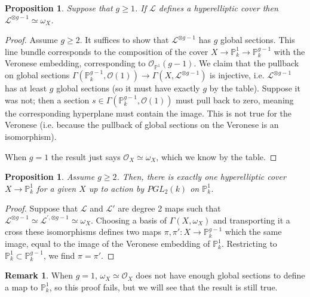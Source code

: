 \documentclass[10pt]{article}
\newtheorem{prop}[thm]{Proposition}
\theoremstyle{definition}
\newtheorem{rmk}[thm]{Remark}
\newcommand{\PP}{\mathbb{P}}
\newcommand{\OO}{\mathcal{O}}
\newcommand{\LL}{\mathcal{L}}
\begin{document}
\begin{prop}
Suppose that $g \geq 1$.  If $\LL$ defines a hyperelliptic cover then $\LL^{\otimes g - 1} \simeq \omega_X$.
\end{prop}
\begin{proof}
Assume $g \geq 2$.  It suffices to show that $\LL^{\otimes g-1}$ has $g$ global sections.  This line bundle corresponds to the composition of the cover $X \rightarrow \PP^1_k \rightarrow \PP^{g-1}_k$ with the Veronese embedding, corresponding to $\OO_{\PP^1}(g-1)$.   We claim that the pullback on global sections $\Gamma(\PP^{g-1}_k, \OO(1)) \rightarrow \Gamma(X, \LL^{\otimes g-1})$ is injective, i.e. $\LL^{\otimes g-1}$ has at least $g$ global sections (so it must have exactly $g$ by the table).  Suppose it was not; then a section $s \in \Gamma(\PP^{g-1}_k, \OO(1))$ must pull back to zero, meaning the corresponding hyperplane must contain the image.  This is not true for the Veronese (i.e. because the pullback of global sections on the Veronese is an isomorphism).

When $g=1$ the result just says $\OO_X \simeq \omega_X$, which we know by the table.
\end{proof}

\begin{prop}
Assume $g \geq 2$.  Then, there is exactly one hyperelliptic cover $X \rightarrow \PP^1_k$ for a given $X$ up to action by $PGL_2(k)$ on $\PP^1_k$.
\end{prop}
\begin{proof}
Suppose that $\LL$ and $\LL'$ are degree 2 maps such that $\LL^{\otimes g-1} \simeq \LL^{', \otimes g-1} \simeq \omega_X$.  Choosing a basis of $\Gamma(X, \omega_X)$ and transporting it a cross these isomorphisms defines two maps $\pi, \pi': X \rightarrow \mathbb{P}^{g-1}_k$ which the same image, equal to the image of the Veronese embedding of $\PP^1_k$.  Restricting to $\PP^1_k \subset \PP^{g-1}_k$, we find $\pi = \pi'$.
\end{proof}

\begin{rmk}
When $g=1$, $\omega_X \simeq \OO_X$ does not have enough global sections to define a map to $\PP^1_k$, so this proof fails, but we will see that the result is still true.
\end{rmk}
\end{document}
